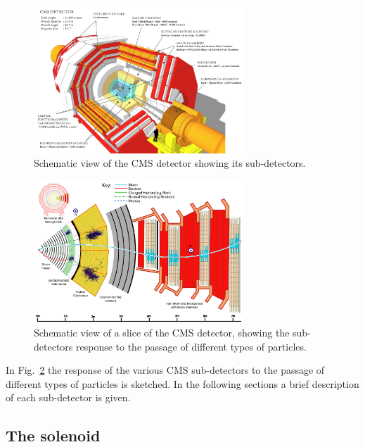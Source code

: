 \begin{figure}[htb]
\centering
\includegraphics[width=0.7\textwidth]{images/CMS.pdf}
\caption{Schematic view of the CMS detector showing its sub-detectors.}\label{fig:CMS}
\end{figure}
\begin{figure}[htb]
\centering
\includegraphics[width=0.7\textwidth]{images/CMSslice.png}
\caption{Schematic view of a slice of the CMS detector, showing the sub-detectors response to the passage of different types of particles.}\label{fig:CMSslice}
\end{figure}

In Fig.~\ref{fig:CMSslice} the response of the various CMS sub-detectors to the passage of different types of particles is sketched. In the following sections a brief description of each sub-detector is given.

\subsection{The solenoid}

